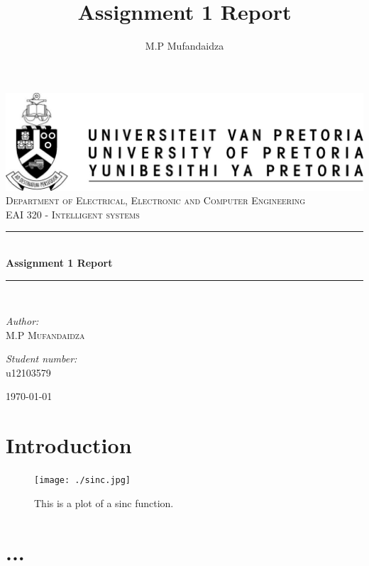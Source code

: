 \documentclass[a4paper,12pt]{report}
\author{M.P Mufandaidza}
\title{ Assignment 1 Report}
\newcommand{\HRule}{\rule{\linewidth}{0.5mm}}
\begin{document}
\setlength{\parskip}{6pt}
\begin{titlepage}

\begin{center}
\includegraphics[width=1\textwidth]{./up-logo.jpg}\\[0.4cm]    
\textsc{\LARGE Department of Electrical, Electronic and Computer Engineering}\\[1.5cm]
\textsc{\Large EAI 320 - Intelligent systems}\\[0.5cm]
\HRule \\[0.4cm]
{ \huge \bfseries Assignment 1 Report}\\[0.4cm]
\HRule \\[0.4cm]
\begin{minipage}{0.4\textwidth}
\begin{flushleft} \large
\emph{Author:}\\
M.P \textsc{Mufandaidza}
\end{flushleft}
\end{minipage}
\begin{minipage}{0.4\textwidth}
\begin{flushright} \large
\emph{Student number:} \\
u12103579
\end{flushright}
\end{minipage}
\vfill
{\large \today}
\end{center}
\end{titlepage}
\footnotesize

\normalsize
\setcounter{chapter}{1}
\renewcommand{\thesection}{\arabic{section}}

\section{Introduction}



\begin{figure}[h]
  \label{fig:SLAM}
  \texttt{[image: ./sinc.jpg]}
  \caption{This is a plot of a sinc function.}
\end{figure}


\newpage
\section{...}


{} %

\end{document}
